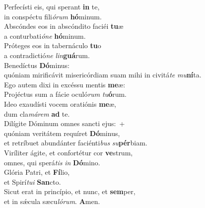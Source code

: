 \evenverse Perfecísti eis, qui sperant \textbf{in} te,~\*\\
\evenverse in conspéctu fili\textit{ó}\textit{rum} \textbf{hó}minum.\\
\oddverse Abscóndes eos in abscóndito faciéi \textbf{tu}æ~\*\\
\oddverse a conturbati\textit{ó}\textit{ne} \textbf{hó}minum.\\
\evenverse Próteges eos in tabernáculo \textbf{tu}o~\*\\
\evenverse a contradictió\textit{ne} \textit{lin}\textbf{guá}rum.\\
\oddverse Benedíctus \textbf{Dó}minus:~\*\\
\oddverse quóniam mirificávit misericórdiam suam mihi in civitá\textit{te} \textit{mu}\textbf{ní}ta.\\
\evenverse Ego autem dixi in excéssu mentis \textbf{me}æ:~\*\\
\evenverse Projéctus sum a fácie oculó\textit{rum} \textit{tu}\textbf{ó}rum.\\
\oddverse Ideo exaudísti vocem oratiónis \textbf{me}æ,~\*\\
\oddverse dum cla\textit{má}\textit{rem} \textbf{ad} te.\\
\evenverse Dilígite Dóminum omnes sancti ejus:~+\\
\evenverse  quóniam veritátem requíret \textbf{Dó}minus,~\*\\
\evenverse et retríbuet abundánter faciénti\textit{bus} \textit{su}\textbf{pér}biam.\\
\oddverse Viríliter ágite, et confortétur cor \textbf{ve}strum,~\*\\
\oddverse omnes, qui sperá\textit{tis} \textit{in} \textbf{Dó}mino.\\
\evenverse Glória Patri, et \textbf{Fí}lio,~\*\\
\evenverse et Spirí\textit{tu}\textit{i} \textbf{San}cto.\\
\oddverse Sicut erat in princípio, et nunc, et \textbf{sem}per,~\*\\
\oddverse et in sǽcula sæcu\textit{ló}\textit{rum}. \textbf{A}men.\\
